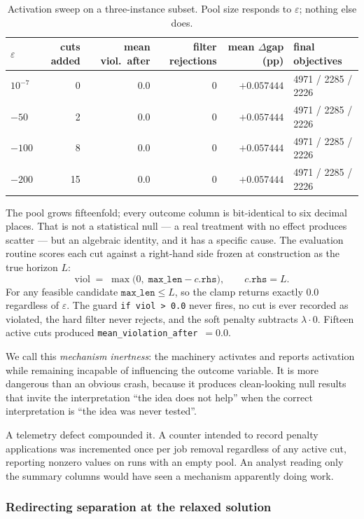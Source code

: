 \documentclass[11pt,a4paper]{article}
\begin{document}
\begin{table}[htbp]
\centering
\caption{Activation sweep on a three-instance subset. Pool size responds to
$\varepsilon$; nothing else does.}
\label{tab:sweep}
\begin{tabular}{lrrrrl}
\toprule
$\varepsilon$ & cuts added & mean viol.\ after & filter rejections & mean $\Delta$gap (pp) & final objectives \\
\midrule
$10^{-7}$ & 0  & 0.0 & 0 & $+0.057444$ & 4971 / 2285 / 2226 \\
$-50$     & 2  & 0.0 & 0 & $+0.057444$ & 4971 / 2285 / 2226 \\
$-100$    & 8  & 0.0 & 0 & $+0.057444$ & 4971 / 2285 / 2226 \\
$-200$    & 15 & 0.0 & 0 & $+0.057444$ & 4971 / 2285 / 2226 \\
\bottomrule
\end{tabular}
\end{table}

The pool grows fifteenfold; every outcome column is bit-identical to six decimal
places. That is not a statistical null --- a real treatment with no effect produces
scatter --- but an algebraic identity, and it has a specific cause. The evaluation
routine scores each cut against a right-hand side frozen at construction as the
true horizon $L$:
\[
\text{viol} \;=\; \max\bigl(0,\; \texttt{max\_len}-c.\texttt{rhs}\bigr),
\qquad c.\texttt{rhs}=L .
\]
For any feasible candidate $\texttt{max\_len}\le L$, so the clamp returns exactly
$0.0$ regardless of $\varepsilon$. The guard \texttt{if viol > 0.0} never fires, no
cut is ever recorded as violated, the hard filter never rejects, and the soft
penalty subtracts $\lambda\cdot 0$. Fifteen active cuts produced
\texttt{mean\_violation\_after}~$=0.0$.

We call this \emph{mechanism inertness}: the machinery activates and reports
activation while remaining incapable of influencing the outcome variable. It is
more dangerous than an obvious crash, because it produces clean-looking null
results that invite the interpretation ``the idea does not help'' when the correct
interpretation is ``the idea was never tested''.

A telemetry defect compounded it. A counter intended to record penalty
applications was incremented once per job removal regardless of any active cut,
reporting nonzero values on runs with an empty pool. An analyst reading only the
summary columns would have seen a mechanism apparently doing work.

\subsubsection{Redirecting separation at the relaxed solution}\label{sec:s0}
\end{document}
